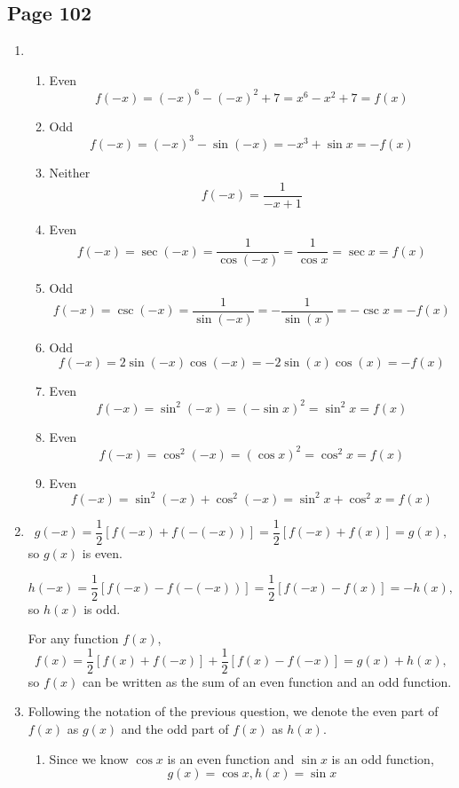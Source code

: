 \documentclass{article}
\newenvironment{solutions}[1]
{\subsection*{#1}
 \begin{enumerate}[leftmargin=1.5em]}
{\end{enumerate}}
\newcommand{\solution}{\item}
\newenvironment{subsolutions}
{\begin{enumerate}}
{\end{enumerate}}
\newcommand{\subsolution}{\item}
\begin{document}
\begin{solutions}{Page 102}
\solution %
\begin{subsolutions}
\subsolution %
Even
\[
f\left(-x\right) = \left(-x\right)^6-\left(-x\right)^2+7 = x^6-x^2+7 = f\left(x\right)
\]
\subsolution %
Odd
\[
f\left(-x\right) = \left(-x\right)^3-\sin\left(-x\right)= -x^3+\sin{x}= -f\left(x\right)
\]
\subsolution %
Neither
\[
f\left(-x\right) = \dfrac{1}{-x+1}
\]
\subsolution %
Even
\[
f\left(-x\right) = \sec\left(-x\right) = \dfrac{1}{\cos\left(-x\right)} = \dfrac{1}{\cos{x}} = \sec{x} = f\left(x\right)
\]
\subsolution %
Odd
\[
f\left(-x\right) = \csc\left(-x\right) = \dfrac{1}{\sin\left(-x\right)} = -\dfrac{1}{\sin\left(x\right)} =-\csc{x} = -f\left(x\right)
\]
\subsolution %
Odd
\[
f\left(-x\right) = 2\sin\left(-x\right)\cos\left(-x\right) = -2\sin\left(x\right)\cos\left(x\right) = -f\left(x\right)
\]
\subsolution %
Even
\[
f\left(-x\right) = \sin^{2}\left(-x\right)  = \left(-\sin{x}\right)^{2} = \sin^{2}{x} = f\left(x\right)
\]

\subsolution %
Even
\[
f\left(-x\right) = \cos^{2}\left(-x\right) = \left(\cos{x}\right)^{2} = \cos^{2}{x} = f\left(x\right)
\]

\subsolution %
Even
\[
f\left(-x\right) = \sin^{2}\left(-x\right) + \cos^{2}\left(-x\right) =  \sin^{2}{x} + \cos^{2}{x} = f\left(x\right)
\]
\end{subsolutions}

\solution %
\[
g\left(-x\right) = \dfrac{1}{2}\left[f\left(-x\right)+f\left(-\left(-x\right)\right)\right] = \dfrac{1}{2}\left[f\left(-x\right)+f\left(x\right)\right] = g\left(x\right),
\]
so $g\left(x\right)$ is even.

\[
h\left(-x\right) = \dfrac{1}{2}\left[f\left(-x\right)-f\left(-\left(-x\right)\right)\right] = \dfrac{1}{2}\left[f\left(-x\right)-f\left(x\right)\right] = -h\left(x\right),
\]
so $h\left(x\right)$ is odd.

For any function $f\left(x\right)$,
\[
f\left(x\right) = \dfrac{1}{2}\left[f\left(x\right) + f\left(-x\right)\right] + \dfrac{1}{2}\left[f\left(x\right) - f\left(-x\right)\right] = g\left(x\right) + h\left(x\right),
\]
so $f\left(x\right)$ can be written as the sum of an even function and an odd function.

\solution %
Following the notation of the previous question, we denote the even part of $f\left(x\right)$ as $g\left(x\right)$ and the odd part of $f\left(x\right)$ as $h\left(x\right)$.
\begin{subsolutions}
\subsolution %
Since we know $\cos{x}$ is an even function and $\sin{x}$ is an odd function,
\[
g\left(x\right)=\cos{x}, h\left(x\right)=\sin{x}
\]


\end{subsolutions}
\end{solutions}
\end{document}
